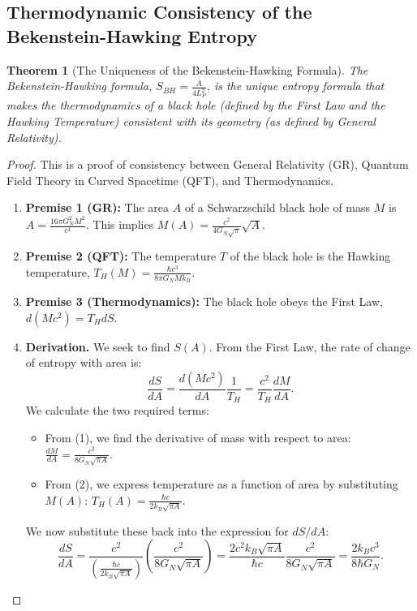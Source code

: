 \documentclass[11pt, letterpaper]{report}
\theoremstyle{plain} %
\newtheorem{theorem}{Theorem}[chapter]
\theoremstyle{definition} %
\theoremstyle{remark} %
\begin{document}
\subsection{Thermodynamic Consistency of the Bekenstein-Hawking Entropy}
\label{subsec:verify_bekenstein_hawking}

\begin{theorem}[The Uniqueness of the Bekenstein-Hawking Formula]
\label{thm:verify_bh_entropy}
The Bekenstein-Hawking formula, $S_{BH} = \frac{A}{4L_P^2}$, is the unique entropy formula that makes the thermodynamics of a black hole (defined by the First Law and the Hawking Temperature) consistent with its geometry (as defined by General Relativity).
\end{theorem}
\begin{proof}
This is a proof of consistency between General Relativity (GR), Quantum Field Theory in Curved Spacetime (QFT), and Thermodynamics.
\begin{enumerate}
    \item \textbf{Premise 1 (GR):} The area $A$ of a Schwarzschild black hole of mass $M$ is $A = \frac{16\pi G_N^2 M^2}{c^4}$. This implies $M(A) = \frac{c^2}{4G_N\sqrt{\pi}}\sqrt{A}$.
    \item \textbf{Premise 2 (QFT):} The temperature $T$ of the black hole is the Hawking temperature, $T_H(M) = \frac{\hbar c^3}{8\pi G_N M k_B}$.
    \item \textbf{Premise 3 (Thermodynamics):} The black hole obeys the First Law, $d(Mc^2) = T_H dS$.
    \item \textbf{Derivation.} We seek to find $S(A)$. From the First Law, the rate of change of entropy with area is:
    \begin{equation}
        \frac{dS}{dA} = \frac{d(Mc^2)}{dA} \frac{1}{T_H} = \frac{c^2}{T_H}\frac{dM}{dA}.
    \end{equation}
    We calculate the two required terms:
    \begin{itemize}
        \item From (1), we find the derivative of mass with respect to area: $\frac{dM}{dA} = \frac{c^2}{8G_N\sqrt{\pi A}}$.
        \item From (2), we express temperature as a function of area by substituting $M(A)$: $T_H(A) = \frac{\hbar c}{2k_B\sqrt{\pi A}}$.
    \end{itemize}
    We now substitute these back into the expression for $dS/dA$:
    \begin{equation}
        \frac{dS}{dA} = \frac{c^2}{\left(\frac{\hbar c}{2k_B\sqrt{\pi A}}\right)} \left( \frac{c^2}{8G_N\sqrt{\pi A}} \right) = \frac{2c^2k_B\sqrt{\pi A}}{\hbar c} \frac{c^2}{8G_N\sqrt{\pi A}} = \frac{2k_B c^3}{8\hbar G_N}.

\end{equation}
\end{enumerate}
\end{proof}
\end{document}
